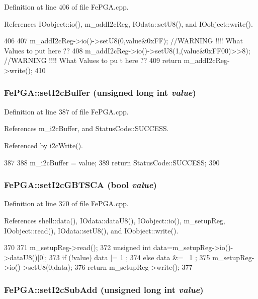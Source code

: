 Definition at line 406 of file FePGA.cpp.

References IOobject::io(), m\_\-addI2cReg, IOdata::setU8(), and IOobject::write().


\begin{DoxyCode}
406                                                     {
407   m_addI2cReg->io()->setU8(0,value&0xFF); //WARNING !!!! What Values to put here 
      ??
408   m_addI2cReg->io()->setU8(1,(value&0xFF00)>>8); //WARNING !!!! What Values to pu
      t here ??
409   return m_addI2cReg->write();
410 }
\end{DoxyCode}
\hypertarget{classFePGA_aaf52ed549f6b79d53f49c3f85c5fbad2}{
\subsubsection[{setI2cBuffer}]{ FePGA::setI2cBuffer (unsigned long int {\em value})}}
\label{classFePGA_aaf52ed549f6b79d53f49c3f85c5fbad2}


Definition at line 387 of file FePGA.cpp.

References m\_\-i2cBuffer, and StatusCode::SUCCESS.

Referenced by i2cWrite().


\begin{DoxyCode}
387                                                        {
388   m_i2cBuffer = value;
389   return StatusCode::SUCCESS;
390 }
\end{DoxyCode}
\hypertarget{classFePGA_ac9a16de5f01fda901494abe61efb5029}{
\subsubsection[{setI2cGBTSCA}]{ FePGA::setI2cGBTSCA (bool {\em value})}}
\label{classFePGA_ac9a16de5f01fda901494abe61efb5029}


Definition at line 370 of file FePGA.cpp.

References shell::data(), IOdata::dataU8(), IOobject::io(), m\_\-setupReg, IOobject::read(), IOdata::setU8(), and IOobject::write().


\begin{DoxyCode}
370                                           {
371   m_setupReg->read();
372   unsigned int data=m_setupReg->io()->dataU8()[0];
373   if (!value) data |= 1  ;
374   else        data &= ~1 ;
375   m_setupReg->io()->setU8(0,data);
376   return m_setupReg->write();
377 }
\end{DoxyCode}
\hypertarget{classFePGA_a37c1ee5bf89667c641f321479697166f}{
\subsubsection[{setI2cSubAdd}]{ FePGA::setI2cSubAdd (unsigned long int {\em value})}}
\label{classFePGA_a37c1ee5bf89667c641f321479697166f}


